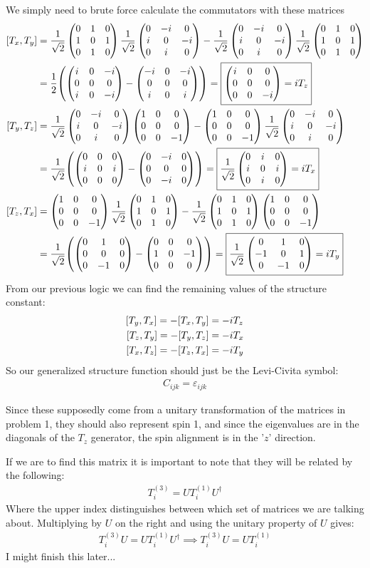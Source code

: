 \documentclass[12pt]{article}
\newcommand{\tx}{\frac{1}{\sqrt{2}}\pmqty{0&1&0\\1&0&1\\0&1&0}}
\newcommand{\ty}{\frac{1}{\sqrt{2}}\pmqty{0&-i&0\\i&0&-i\\0&i&0}}
\newcommand{\tz}{\pmqty{1&0&0\\0&0&0\\0&0&-1}}
\begin{document}
We simply need to brute force calculate the commutators with these matrices
\begin{align*}
  \comm{T_x}{T_y}&=\tx\ty-\ty\tx\\
  &=\frac{1}{2}\qty(\pmqty{i&0&-i\\0&0&0\\i&0&-i}-\pmqty{-i&0&-i\\0&0&0\\i&0&i})
  =\boxed{\pmqty{\dmat[0]{i,0,-i}}=iT_z}\\
  \comm{T_y}{T_z}&=\ty\tz-\tz\ty\\
  &=\frac{1}{\sqrt{2}}
  \qty(\pmqty{0&0&0\\i&0&i\\0&0&0}-\pmqty{0&-i&0\\0&0&0\\0&-i&0})
  =\boxed{\frac{1}{\sqrt{2}}\pmqty{0&i&0\\i&0&i\\0&i&0}=iT_x}\\
  \comm{T_z}{T_x}&=\tz\tx-\tx\tz\\
  &=\frac{1}{\sqrt{2}}
  \qty(\pmqty{0&1&0\\0&0&0\\0&-1&0}-\pmqty{0&0&0\\1&0&-1\\0&0&0})
  =\boxed{\frac{1}{\sqrt{2}}\pmqty{0&1&0\\-1&0&1\\0&-1&0}=iT_y}
\end{align*}
From our previous logic we can find the remaining values of the structure constant:
\begin{align*}
  \comm{T_y}{T_x}=-\comm{T_x}{T_y}&=-iT_z\\
  \comm{T_z}{T_y}=-\comm{T_y}{T_z}&=-iT_x\\
  \comm{T_x}{T_z}=-\comm{T_z}{T_x}&=-iT_y
\end{align*}
So our generalized structure function should just be the Levi-Civita symbol:
\begin{align*}
  \boxed{C_{ijk}=\varepsilon_{ijk}}
\end{align*}

Since these supposedly come from a unitary transformation of the matrices in problem 1, they should also represent spin 1, and since the eigenvalues are in the diagonals of the $T_z$ generator, the spin alignment is in the '$z$' direction.

If we are to find this matrix it is important to note that they will be related by the following:
\begin{align*}
  T_i^{(3)}=UT_i^{(1)}U^\dag
\end{align*}
Where the upper index distinguishes between which set of matrices we are talking about. Multiplying by $U$ on the right and using the unitary property of $U$ gives:
\begin{align*}
  T_i^{(3)}U=UT_i^{(1)}U^\dag \implies T_i^{(3)}U=UT_i^{(1)}
\end{align*}
I might finish this later...
\end{document}
